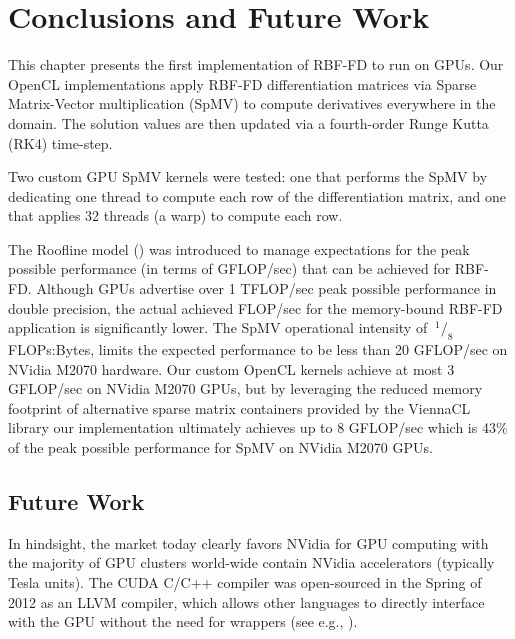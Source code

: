 \documentclass{report}
\begin{document}
\section{Conclusions and Future Work}

This chapter presents the first implementation of RBF-FD to run on GPUs. Our OpenCL implementations apply RBF-FD differentiation matrices via Sparse Matrix-Vector multiplication (SpMV) to compute derivatives everywhere in the domain. The solution values are then updated via a fourth-order Runge Kutta (RK4) time-step. 

Two custom GPU SpMV kernels were tested: one that performs the SpMV by dedicating one thread to compute each row of the differentiation matrix, and one that applies 32 threads (a warp) to compute each row. 

The Roofline model (\cite{Williams2009}) was introduced to manage expectations for the peak possible performance (in terms of GFLOP/sec) that can be achieved for RBF-FD. Although GPUs advertise over 1 TFLOP/sec peak possible performance in double precision, the actual achieved FLOP/sec for the memory-bound RBF-FD application is significantly lower. The SpMV operational intensity of $\ ^{1}/_{8}$ FLOPs:Bytes, limits the expected performance to be less than 20 GFLOP/sec on NVidia M2070 hardware. Our custom OpenCL kernels achieve at most 3 GFLOP/sec on NVidia M2070 GPUs, but by leveraging the reduced memory footprint of alternative sparse matrix containers provided by the ViennaCL library our implementation ultimately achieves up to 8 GFLOP/sec which is 43\% of the peak possible performance for SpMV on NVidia M2070 GPUs.


\subsection{Future Work} 


In hindsight, the market today clearly favors NVidia for GPU computing with the majority of GPU clusters world-wide contain NVidia accelerators (typically Tesla units). The CUDA C/C++ compiler was open-sourced in the Spring of 2012 as an LLVM compiler, which allows other languages to directly interface with the GPU without the need for wrappers (see e.g., \cite{NumbaPro}). 

\end{document}
